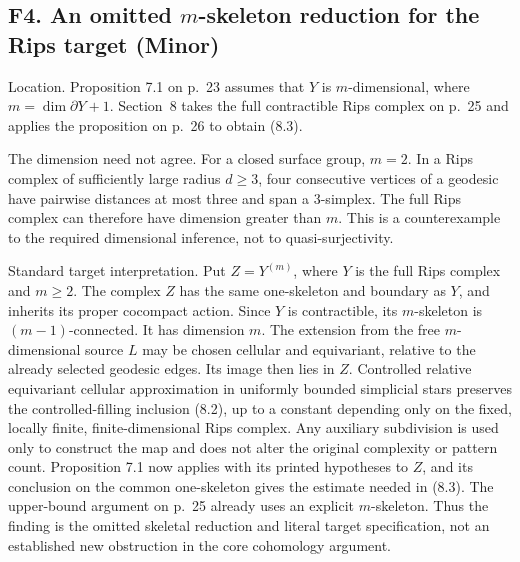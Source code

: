\documentclass[10pt]{article}
\begin{document}
\subsection*{F4. An omitted \(m\)-skeleton reduction for the Rips target (Minor)}
Location. Proposition 7.1 on p. 23 assumes that \(Y\) is \(m\)-dimensional, where \(m=\dim\partial Y+1\). Section 8 takes the full contractible Rips complex on p. 25 and applies the proposition on p. 26 to obtain (8.3).\par
The dimension need not agree. For a closed surface group, \(m=2\). In a Rips complex of sufficiently large radius \(d\ge3\), four consecutive vertices of a geodesic have pairwise distances at most three and span a \(3\)-simplex. The full Rips complex can therefore have dimension greater than \(m\). This is a counterexample to the required dimensional inference, not to quasi-surjectivity.\par
Standard target interpretation. Put \(Z=Y^{(m)}\), where \(Y\) is the full Rips complex and \(m\ge2\). The complex \(Z\) has the same one-skeleton and boundary as \(Y\), and inherits its proper cocompact action. Since \(Y\) is contractible, its \(m\)-skeleton is \((m-1)\)-connected. It has dimension \(m\). The extension from the free \(m\)-dimensional source \(L\) may be chosen cellular and equivariant, relative to the already selected geodesic edges. Its image then lies in \(Z\). Controlled relative equivariant cellular approximation in uniformly bounded simplicial stars preserves the controlled-filling inclusion (8.2), up to a constant depending only on the fixed, locally finite, finite-dimensional Rips complex. Any auxiliary subdivision is used only to construct the map and does not alter the original complexity or pattern count. Proposition 7.1 now applies with its printed hypotheses to \(Z\), and its conclusion on the common one-skeleton gives the estimate needed in (8.3). The upper-bound argument on p. 25 already uses an explicit \(m\)-skeleton. Thus the finding is the omitted skeletal reduction and literal target specification, not an established new obstruction in the core cohomology argument.\par
\end{document}
